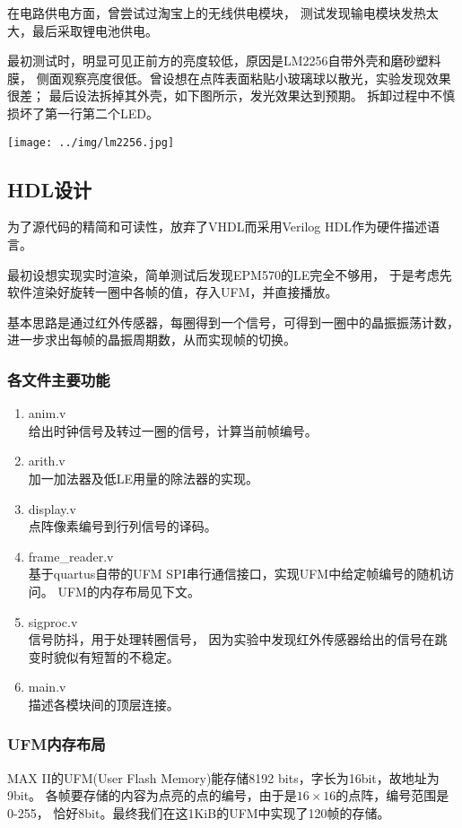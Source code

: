在电路供电方面，曾尝试过淘宝上的无线供电模块，
测试发现输电模块发热太大，最后采取锂电池供电。

最初测试时，明显可见正前方的亮度较低，原因是LM2256自带外壳和磨砂塑料膜，
侧面观察亮度很低。曾设想在点阵表面粘贴小玻璃球以散光，实验发现效果很差；
最后设法拆掉其外壳，如下图所示，发光效果达到预期。
拆卸过程中不慎损坏了第一行第二个LED。
\begin{center}
	\texttt{[image: ../img/lm2256.jpg]}
\end{center}


\subsection{HDL设计}
为了源代码的精简和可读性，放弃了VHDL而采用Verilog HDL作为硬件描述语言。

最初设想实现实时渲染，简单测试后发现EPM570的LE完全不够用，
于是考虑先软件渲染好旋转一圈中各帧的值，存入UFM，并直接播放。

基本思路是通过红外传感器，每圈得到一个信号，可得到一圈中的晶振振荡计数，
进一步求出每帧的晶振周期数，从而实现帧的切换。

\subsubsection{各文件主要功能}
\begin{enumerate}
	\item anim.v \\
		给出时钟信号及转过一圈的信号，计算当前帧编号。
	\item arith.v \\
		加一加法器及低LE用量的除法器的实现。
	\item display.v \\
		点阵像素编号到行列信号的译码。
	\item frame\_reader.v \\
		基于quartus自带的UFM SPI串行通信接口，实现UFM中给定帧编号的随机访问。
		UFM的内存布局见下文。
	\item sigproc.v \\
		信号防抖，用于处理转圈信号，
		因为实验中发现红外传感器给出的信号在跳变时貌似有短暂的不稳定。
	\item main.v \\
		描述各模块间的顶层连接。
\end{enumerate}

\subsubsection{UFM内存布局}
MAX II的UFM(User Flash Memory)能存储8192 bits，字长为16bit，故地址为9bit。
各帧要存储的内容为点亮的点的编号，由于是$16\times 16$的点阵，编号范围是0-255，
恰好8bit。最终我们在这1KiB的UFM中实现了120帧的存储。

